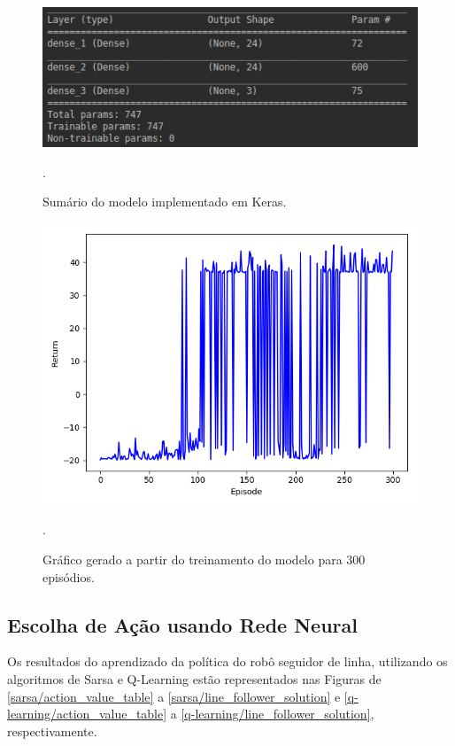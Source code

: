 \documentclass[conference]{IEEEtran}
\begin{document}
\begin{figure}[htbp]
\centering
\centerline{\includegraphics[scale=0.5]{imagens/summary.png}}
\caption{Sumário do modelo implementado em Keras.}.
\label{summary}
\end{figure}

\begin{figure}[htbp]
\centering
\centerline{\includegraphics[scale=0.3]{imagens/train/15.png}}
\caption{Gráfico gerado a partir do treinamento do modelo para 300 episódios.}.
\label{train/15}
\end{figure} 

	\subsection{Escolha de Ação usando Rede Neural}

Os resultados do aprendizado da política do robô seguidor de linha, utilizando os algoritmos de Sarsa e Q-Learning estão representados nas Figuras de \ref{sarsa/action_value_table} a \ref{sarsa/line_follower_solution} e \ref{q-learning/action_value_table} a \ref{q-learning/line_follower_solution}, respectivamente.
\end{document}
